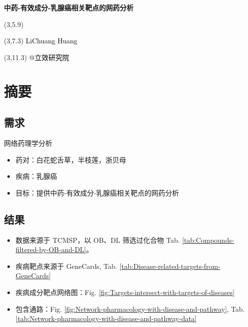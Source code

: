 \documentclass[
]{article}
\author{}
\date{\vspace{-2.5em}}
\providecommand{\tightlist}{%
  \setlength{\itemsep}{0pt}\setlength{\parskip}{0pt}}
\begin{document}
\begin{titlepage} 
\begin{center} \textbf{\Huge
中药-有效成分-乳腺癌相关靶点的网药分析}
\vspace{4em} \begin{textblock}{10}(3,5.9) \huge
\textbf{\textcolor{white}{2024-05-22}}
\end{textblock} \begin{textblock}{10}(3,7.3)
\Large \textcolor{black}{LiChuang Huang}
\end{textblock} \begin{textblock}{10}(3,11.3)
\Large \textcolor{black}{@立效研究院}
\end{textblock} \end{center} \end{titlepage}
\restoregeometry


\tableofcontents

\listoffigures

\listoftables

\newpage


\hypertarget{abstract}{%
\section{摘要}\label{abstract}}

\hypertarget{ux9700ux6c42}{%
\subsection{需求}\label{ux9700ux6c42}}

网络药理学分析

\begin{itemize}
\tightlist
\item
  药对：白花蛇舌草，半枝莲，浙贝母
\item
  疾病：乳腺癌
\item
  目标：提供中药-有效成分-乳腺癌相关靶点的网药分析
\end{itemize}

\hypertarget{ux7ed3ux679c}{%
\subsection{结果}\label{ux7ed3ux679c}}

\begin{itemize}
\tightlist
\item
  数据来源于 TCMSP，以 OB、DL 筛选过化合物 Tab. \ref{tab:Compounds-filtered-by-OB-and-DL}。
\item
  疾病靶点来源于 GeneCards, Tab. \ref{tab:Disease-related-targets-from-GeneCards}
\item
  疾病成分靶点网络图：Fig. \ref{fig:Targets-intersect-with-targets-of-diseases}
\item
  包含通路：Fig. \ref{fig:Network-pharmacology-with-disease-and-pathway},
  Tab. \ref{tab:Network-pharmacology-with-disease-and-pathway-data}
\end{itemize}
\end{document}
